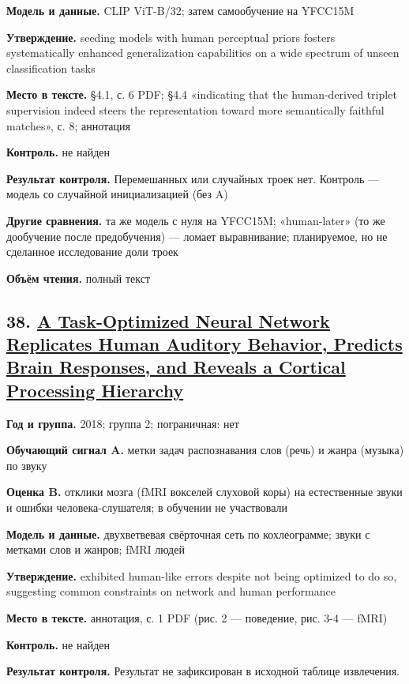 \textbf{Модель и данные.} CLIP ViT-B/32; затем самообучение на YFCC15M

\textbf{Утверждение.} seeding models with human perceptual priors fosters systematically enhanced generalization capabilities on a wide spectrum of unseen classification tasks

\textbf{Место в тексте.} §4.1, с. 6 PDF; §4.4 «indicating that the human-derived triplet supervision indeed steers the representation toward more semantically faithful matches», с. 8; аннотация

\textbf{Контроль.} не найден

\textbf{Результат контроля.} Перемешанных или случайных троек нет. Контроль — модель со случайной инициализацией (без A)

\textbf{Другие сравнения.} та же модель с нуля на YFCC15M; «human-later» (то же дообучение после предобучения) — ломает выравнивание; планируемое, но не сделанное исследование доли троек

\textbf{Объём чтения.} полный текст


\subsection*{38. \href{https://doi.org/10.1016/j.neuron.2018.03.044}{A Task-Optimized Neural Network Replicates Human Auditory Behavior, Predicts Brain Responses, and Reveals a Cortical Processing Hierarchy}}

\textbf{Год и группа.} 2018; группа 2; пограничная: нет

\textbf{Обучающий сигнал A.} метки задач распознавания слов (речь) и жанра (музыка) по звуку

\textbf{Оценка B.} отклики мозга (fMRI вокселей слуховой коры) на естественные звуки и ошибки человека-слушателя; в обучении не участвовали

\textbf{Модель и данные.} двухветвевая свёрточная сеть по кохлеограмме; звуки с метками слов и жанров; fMRI людей

\textbf{Утверждение.} exhibited human-like errors despite not being optimized to do so, suggesting common constraints on network and human performance

\textbf{Место в тексте.} аннотация, с. 1 PDF (рис. 2 — поведение, рис. 3-4 — fMRI)

\textbf{Контроль.} не найден

\textbf{Результат контроля.} Результат не зафиксирован в исходной таблице извлечения.

